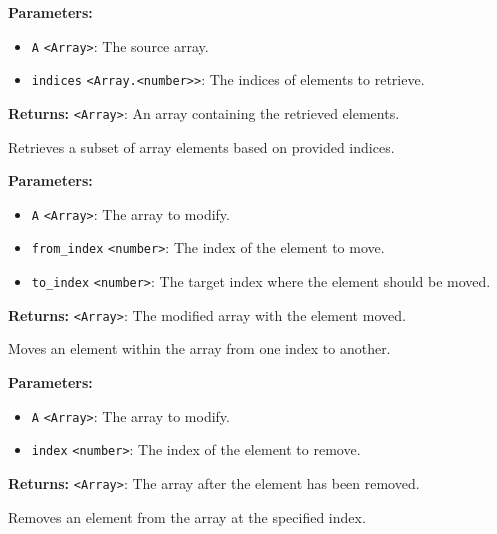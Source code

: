 \documentclass[12pt,a4paper]{article}
\begin{document}
\noindent \textbf{Parameters:}
\begin{itemize}
  \item \texttt{A} \texttt{<Array>}: The source array.
  \item \texttt{indices} \texttt{<Array.<number>>}: The indices of elements to retrieve.
\end{itemize}

\noindent \textbf{Returns:} \texttt{<Array>}: An array containing the retrieved elements.

\noindent Retrieves a subset of array elements based on provided indices.

\vspace{5mm}
\noindent {}


\noindent \textbf{Parameters:}
\begin{itemize}
  \item \texttt{A} \texttt{<Array>}: The array to modify.
  \item \texttt{from\_index} \texttt{<number>}: The index of the element to move.
  \item \texttt{to\_index} \texttt{<number>}: The target index where the element should be moved.
\end{itemize}

\noindent \textbf{Returns:} \texttt{<Array>}: The modified array with the element moved.

\noindent Moves an element within the array from one index to another.

\vspace{5mm}
\noindent {}


\noindent \textbf{Parameters:}
\begin{itemize}
  \item \texttt{A} \texttt{<Array>}: The array to modify.
  \item \texttt{index} \texttt{<number>}: The index of the element to remove.
\end{itemize}

\noindent \textbf{Returns:} \texttt{<Array>}: The array after the element has been removed.

\noindent Removes an element from the array at the specified index.
\end{document}
